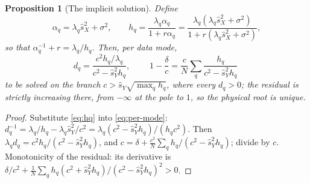 \documentclass[11pt,a4paper]{article}
\newcommand{\sX}{\hat s_X^2}
\newcommand{\sY}{\hat s_Y^2}
\newtheorem{proposition}{Proposition}
\theoremstyle{remark}
\begin{document}
\begin{proposition}[The implicit solution]\label{prop:soln}
Define
\begin{equation}
  \alpha_q = \lambda_q\sX + \sigma^2, \qquad
  h_q = \frac{\lambda_q\alpha_q}{1 + r\alpha_q}
      = \frac{\lambda_q(\lambda_q\sX + \sigma^2)}{1 + r(\lambda_q\sX + \sigma^2)} ,
  \label{eq:hq}
\end{equation}
so that $\alpha_q^{-1} + r = \lambda_q/h_q$. Then, per data mode,
\begin{equation}
  d_q = \frac{c^2 h_q/\lambda_q}{c^2 - \sY h_q},
  \qquad
  \boxed{\;1 - \frac{\delta}{c} = \frac cN\sum_q\frac{h_q}{c^2 - \sY h_q}\;}
  \label{eq:linear-soln}
\end{equation}
to be solved on the branch $c > \hat s_Y\sqrt{\max_q h_q}$, where every $d_q > 0$; the residual is strictly increasing there, from $-\infty$ at the pole to $1$, so the physical root is unique.
\end{proposition}
\begin{proof}
Substitute \eqref{eq:hq} into \eqref{eq:per-mode}: $d_q^{-1} = \lambda_q/h_q - \lambda_q\sY/c^2 = \lambda_q(c^2 - \sY h_q)/(h_qc^2)$. Then $\lambda_qd_q = c^2h_q/(c^2 - \sY h_q)$, and $c = \delta + \frac{c^2}{N}\sum_q h_q/(c^2 - \sY h_q)$; divide by $c$. Monotonicity of the residual: its derivative is $\delta/c^2 + \frac1N\sum_q h_q(c^2 + \sY h_q)/(c^2 - \sY h_q)^2 > 0$.
\end{proof}
\end{document}
